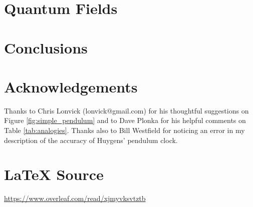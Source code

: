 \documentclass{article}
\theoremstyle{definition}
\begin{document}
\section{Quantum Fields}
\label{sec:quantum_fields}

\section{Conclusions}
\label{sec:conclusions}


\section*{Acknowledgements}
Thanks to Chris Lonvick (lonvick@gmail.com) for his thoughtful
suggestions on Figure \ref{fig:simple_pendulum} and to
Dave Plonka for his helpful comments on Table
\ref{tab:analogies}. Thanks also to Bill Westfield for
noticing an error in my description of the accuracy of
Huygens' pendulum clock.
%
%
\section*{\LaTeX \hspace{0.10 mm} Source}
\url{https://www.overleaf.com/read/xjmyvksvtztb}
%
%
%


%
%
\end{document}
